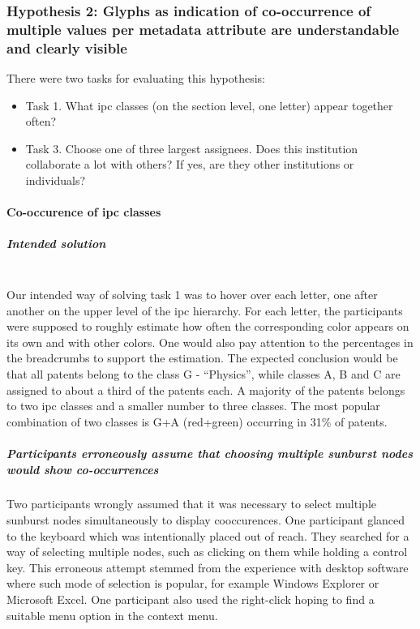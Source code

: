 \subsubsection{Hypothesis 2: Glyphs as indication of co-occurrence of multiple values per metadata attribute are understandable and clearly visible}
\label{subsubsec:hypothesis2}

There were two tasks for evaluating this hypothesis:
\begin{itemize}
	\item Task 1. What \gls{ipc} classes (on the section level, one letter) appear together often?
	\item Task 3. Choose one of three largest assignees. Does this institution collaborate a lot with others? If yes, are they other institutions or individuals?
\end{itemize}

\paragraph{Co-occurence of \gls{ipc} classes}
\subparagraph{Intended solution}~\\
Our intended way of solving task 1 was to hover over each letter, one after another on the upper level of the \gls{ipc} hierarchy.
For each letter, the participants were supposed to roughly estimate how often the corresponding color appears on its own and with other colors.
One would also pay attention to the percentages in the breadcrumbs to support the estimation.
The expected conclusion would be that all patents belong to the class G - ``Physics'', while classes A, B and C are assigned to about a third of the patents each.
A majority of the patents belongs to two \gls{ipc} classes and a smaller number to three classes.
The most popular combination of two classes is G+A (red+green) occurring in 31\% of patents.

\subparagraph{Participants erroneously assume that choosing multiple sunburst nodes would show co-occurrences}
Two participants wrongly assumed that it was necessary to select multiple sunburst nodes simultaneously to display cooccurences.
One participant glanced to the keyboard which was intentionally placed out of reach. 
They searched for a way of selecting multiple nodes, such as clicking on them while holding a control key.
This erroneous attempt stemmed from the experience with desktop software where such mode of selection is popular, for example Windows Explorer or Microsoft Excel.
One participant also used the right-click hoping to find a suitable menu option in the context menu.

